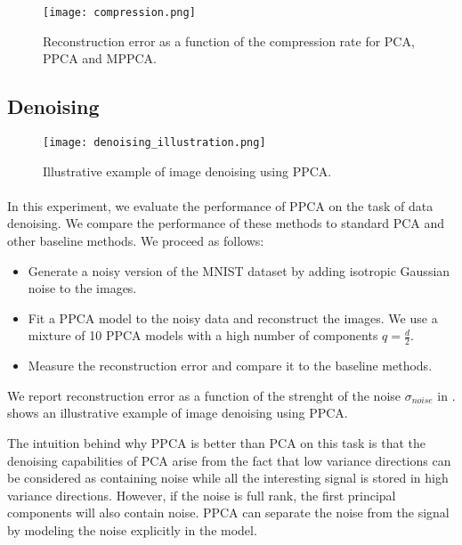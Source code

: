 \documentclass{article}
\begin{document}
\begin{figure}[H]
    \centering
    \texttt{[image: compression.png]}
    \caption{Reconstruction error as a function of the compression rate for PCA, PPCA and MPPCA.}
    \label{fig:compression}
\end{figure}

\subsection{Denoising}

\begin{figure}[H]
    \centering
    \texttt{[image: denoising\_illustration.png]}
    \caption{Illustrative example of image denoising using PPCA.}
    \label{fig:denoising_illustration}
\end{figure}

\paragraph{} In this experiment, we evaluate the performance of PPCA on the task of data denoising. We compare the performance of these methods to standard PCA and other baseline methods. We proceed as follows:

\begin{itemize}
    \item Generate a noisy version of the MNIST dataset by adding isotropic Gaussian noise to the images.
    \item Fit a PPCA model to the noisy data and reconstruct the images. We use a mixture of 10 PPCA models with a high number of components $q = \frac{d}{2}$.
    \item Measure the reconstruction error and compare it to the baseline methods.
\end{itemize}

We report reconstruction error as a function of the strenght of the noise $\sigma_{noise}$ in .  shows an illustrative example of image denoising using PPCA.

The intuition behind why PPCA is better than PCA on this task is that the denoising capabilities of PCA arise from the fact that low variance directions can be considered as containing noise while all the interesting signal is stored in high variance directions. However, if the noise is full rank, the first principal components will also contain noise. PPCA can separate the noise from the signal by modeling the noise explicitly in the model.
\end{document}
